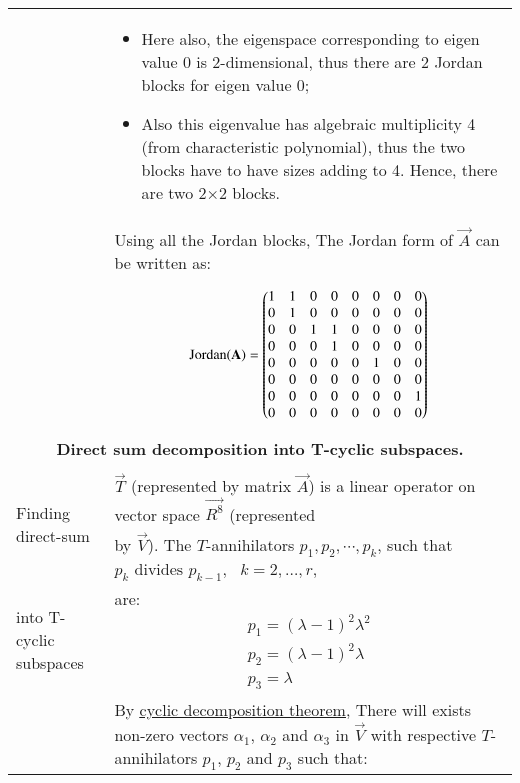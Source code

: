 \begin{longtable}{|p{4cm}|p{14cm}|}
        &\begin{itemize}
            \item Here also, the eigenspace corresponding to eigen value 0 is 2-dimensional, thus there are 2 Jordan blocks for eigen value 0;
            \item  Also this eigenvalue has algebraic multiplicity 4 (from characteristic polynomial), thus the two blocks have to have sizes adding to 4. Hence, there are two 2×2 blocks.
        \end{itemize}\\
        &Using all the Jordan blocks, The Jordan form of $\vec{A}$ can be written as:\\
        &\begin{gather}
            \text{Jordan}(\mathbf{A})= \begin{pmatrix}1 & 1 & 0 & 0 & 0 & 0 & 0 & 0 \\
            0 & 1 & 0 & 0 & 0 & 0 & 0 & 0 \\
            0 & 0 & 1 & 1 & 0 & 0 & 0 & 0 \\
            0 & 0 & 0 & 1 & 0 & 0 & 0 & 0 \\
            0 & 0 & 0 & 0 & 0 & 1 & 0 & 0 \\
            0 & 0 & 0 & 0 & 0 & 0 & 0 & 0 \\
            0 & 0 & 0 & 0 & 0 & 0 & 0 & 1 \\
            0 & 0 & 0 & 0 & 0 & 0 & 0 & 0\end{pmatrix}
        \end{gather}\\
        \hline
        \multicolumn{2}{|c|}{\textbf{Direct sum decomposition into T-cyclic subspaces.}}\\
		\hline
\multirow{3}{*}{Finding direct-sum } & \\
        &$\vec{T}$ (represented by matrix $\vec{A}$) is a linear operator on vector space $\vec{R^8}$ (represented \\decomposition of $\vec{R^8}$
        &  by $\vec{V}$). The $T$-annihilators $p_1,p_2, \cdots, p_k$, such that $p_k \text{ divides } p_{k-1},\text{ }k=2, \hdots,r$,\\into T-cyclic subspaces
        &are: 
        \begin{align}
            p_1=(\lambda-1)^2\lambda^2 \\
            p_2=(\lambda-1)^2\lambda\\
            p_3=\lambda
        \end{align}\\
        & By  \hyperlink{Cyclicdecomposition}{\underline{cyclic decomposition theorem}}, There will exists non-zero vectors $\alpha_1$, $\alpha_2$ and $\alpha_3$ in $\vec{V}$ with respective $T$-annihilators $p_1$, $p_2$ and $p_3$ such that:

\end{longtable}
